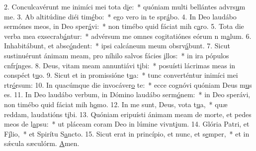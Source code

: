 2. Conculcavérunt me inimíci mei tota d\uline{i}e:~* quóniam multi bellántes advrs\uline{u}m me.
3. Ab altitúdine diéi tim\uline{é}bo:~* ego vero in te spr\uline{á}bo.
4. In Deo laudábo sermónes meos, in Deo sper\uline{á}vi:~* non timébo quid fáciat mih c\uline{a}ro.
5. Tota die verba mea exsecrab\uline{á}ntur:~* advérsum me omnes cogitatiónes eórum n m\uline{a}lum.
6. Inhabitábunt, et absc\uline{ó}ndent:~* ipsi calcáneum meum obsrv\uline{á}bunt.
7. Sicut sustinuérunt ánimam meam, pro níhilo salvos fácies \uline{i}llos:~* in ira pópulos cnfr\uline{í}nges.
8. Deus, vitam meam annuntiávi t\uline{i}bi:~* posuísti lácrimas meas in conspéct t\uline{u}o.
9. Sicut et in promissióne t\uline{u}a:~* tunc converténtur inimíci mei rtr\uline{ó}rsum:
10. In quacúmque die invocáver\uline{o} te:~* ecce cognóvi quóniam Deus m\uline{u}s es.
11. In Deo laudábo verbum, in Dómino laudábo serm\uline{ó}nem:~* in Deo sperávi, non timébo quid fáciat mih h\uline{o}mo.
12. In me sunt, Deus, vota t\uline{u}a,~* quæ reddam, laudatións t\uline{i}bi.
13. Quóniam eripuísti ánimam meam de morte, et pedes meos de l\uline{a}psu:~* ut pláceam coram Deo in lúmine vivnt\uline{i}um.
14. Glória Patri, et F\uline{í}lio,~* et Spirítu S\uline{a}ncto.
15. Sicut erat in princípio, et nunc, et s\uline{e}mper,~* et in sǽcula sæculórm. \uline{A}men.
